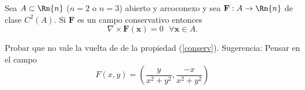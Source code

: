 \begin{propertie}\label{conserv}  Sea $A\subset \Rn{n}$   ($n=2$ o $n=3$)  abierto y arcoconexo y sea  $\mathbf{F}:A  \to \Rn{n}$  de clase $C^{2}(A).$  Si $\mathbf{F}$ es  un campo conservativo entonces $$\nabla \times \mathbf{F}(\mathbf{x}) =0 \:\:\: \forall \mathbf{x} \in A.  $$  
\end{propertie}


\begin{tarea}  Probar que no vale la vuelta de de la propiedad (\ref{conserv}).  Sugerencia:  Pensar en el campo $$F(x,y) = (\dfrac{y}{x^{2}+y^{2}}, \dfrac{-x}{x^{2}+y^{2}}) $$

\end{tarea}